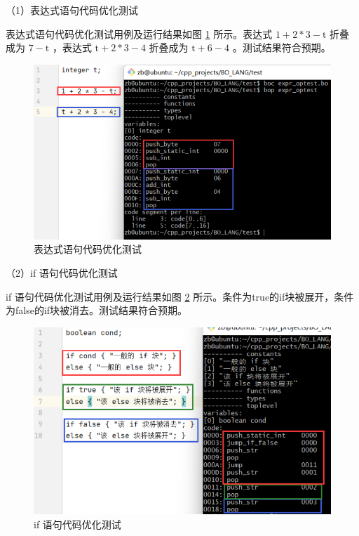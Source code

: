 （1）表达式语句代码优化测试

表达式语句代码优化测试用例及运行结果如图 \ref{test_optimizer1} 所示。表达式 $1+2*3-\text{t}$ 折叠成为 $7-\text{t}$ ，表达式 $\text{t}+2*3-4$ 折叠成为 $\text{t}+6-4$ 。测试结果符合预期。

\begin{figure}[H]
\centering
\includegraphics{figure/test_optimizer1.pdf}
\caption{表达式语句代码优化测试}
\label{test_optimizer1}
\end{figure}

（2）if 语句代码优化测试

if 语句代码优化测试用例及运行结果如图 \ref{test_optimizer2} 所示。条件为true的if块被展开，条件为false的if块被消去。测试结果符合预期。

\begin{figure}[H]
\centering
\includegraphics{figure/test_optimizer2.pdf}
\caption{if 语句代码优化测试}
\label{test_optimizer2}
\end{figure}

